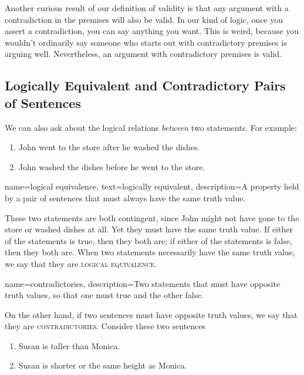 Another curious result of our definition of validity is that any argument with a contradiction in the premises will also be valid. In our kind of logic, once you assert a contradiction, you can say anything you want. This is weird, because you wouldn't ordinarily say someone who starts out with contradictory premises is arguing well. Nevertheless, an argument with contradictory premises is valid.


\subsection{Logically Equivalent and Contradictory Pairs of Sentences}

We can also ask about the logical relations \emph{between} two statements. For example:

\begin{enumerate}[label=(\alph*)]
\item John went to the store after he washed the dishes.
\item John washed the dishes before he went to the store.
\end{enumerate}

{
name={logical equivalence},
text={logically equivalent},
description={A property held by a pair of sentences that must always have the same truth value.}
}

These two statements are both contingent, since John might not have gone to the store or washed dishes at all. Yet they must have the same truth value. If either of the statements is true, then they both are; if either of the statements is false, then they both are. When two statements necessarily have the same truth value, we say that they are \textsc{\gls{logical equivalence}}. \label{def:logical_equivalence}

{
name=contradictories,
description={Two statements that must have opposite truth values, so that one must true and the other false.}
}

On the other hand, if two sentences must have opposite truth values, we say that they are \textsc{\gls{contradictories}}. \label{def:contradictory}Consider these two sentences 

\begin{enumerate}[label=(\alph*)]
\item Susan is taller than Monica.
\item Susan is shorter or the same height as Monica.
\end{enumerate}

